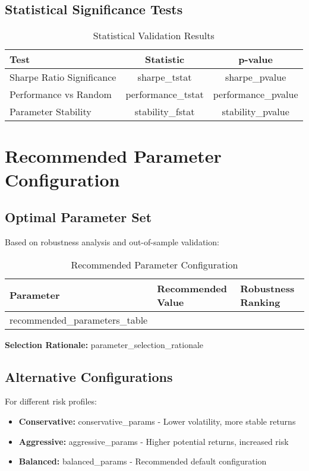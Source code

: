 \documentclass[11pt,a4paper]{article}
\begin{document}
\subsection{Statistical Significance Tests}
\begin{table}[H]
\centering
\caption{Statistical Validation Results}
\begin{tabular}{lcc}
\toprule
\textbf{Test} & \textbf{Statistic} & \textbf{p-value} \\
\midrule
Sharpe Ratio Significance & {{sharpe_tstat}} & {{sharpe_pvalue}} \\
Performance vs Random & {{performance_tstat}} & {{performance_pvalue}} \\
Parameter Stability & {{stability_fstat}} & {{stability_pvalue}} \\
\bottomrule
\end{tabular}
\end{table}

\section{Recommended Parameter Configuration}

\subsection{Optimal Parameter Set}
Based on robustness analysis and out-of-sample validation:

\begin{table}[H]
\centering
\caption{Recommended Parameter Configuration}
\begin{tabular}{lll}
\toprule
\textbf{Parameter} & \textbf{Recommended Value} & \textbf{Robustness Ranking} \\
\midrule
{{recommended_parameters_table}}
\bottomrule
\end{tabular}
\end{table}

\textbf{Selection Rationale:} {{parameter_selection_rationale}}

\subsection{Alternative Configurations}
For different risk profiles:

\begin{itemize}
\item \textbf{Conservative:} {{conservative_params}} - Lower volatility, more stable returns
\item \textbf{Aggressive:} {{aggressive_params}} - Higher potential returns, increased risk
\item \textbf{Balanced:} {{balanced_params}} - Recommended default configuration
\end{itemize}
\end{document}
